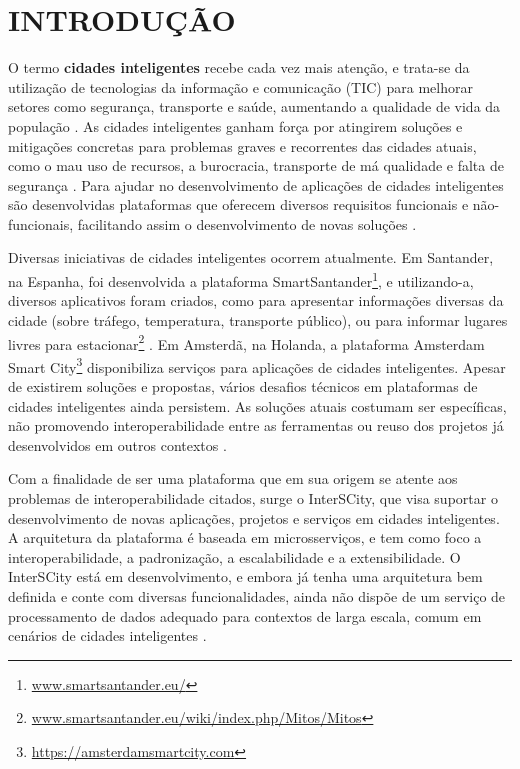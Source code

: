 \chapter[INTRODUÇÃO]{INTRODUÇÃO}
\label{chapter:intro}

O termo \textbf{cidades inteligentes} recebe cada vez mais atenção, e trata-se
da utilização de tecnologias da informação e comunicação (TIC) para melhorar
setores como segurança, transporte e saúde, aumentando a qualidade de vida
da população \cite{batty2012smart}. As cidades inteligentes ganham força por
atingirem soluções e mitigações concretas para problemas graves e recorrentes
das cidades atuais, como o mau uso de recursos, a burocracia, transporte de má
qualidade e falta de segurança \cite{batty2012smart}. Para ajudar no
desenvolvimento de aplicações de cidades inteligentes são desenvolvidas
plataformas que oferecem diversos requisitos funcionais e não-funcionais,
facilitando assim o desenvolvimento de novas soluções \cite{kon2016}.

Diversas iniciativas de cidades inteligentes ocorrem atualmente. Em Santander,
na Espanha, foi desenvolvida a plataforma
SmartSantander\footnote{\url{www.smartsantander.eu/}}, e utilizando-a,
diversos aplicativos foram criados, como para apresentar informações diversas
da cidade (sobre tráfego, temperatura, transporte público), ou para informar
lugares livres para
estacionar\footnote{\url{www.smartsantander.eu/wiki/index.php/Mitos/Mitos}}
\cite{gutierrez2013}.  Em Amsterdã, na Holanda, a plataforma Amsterdam Smart
City\footnote{\url{https://amsterdamsmartcity.com}} disponibiliza serviços para
aplicações de cidades inteligentes. Apesar de existirem soluções
e propostas, vários desafios técnicos em plataformas de cidades inteligentes
ainda persistem. As soluções atuais costumam ser específicas, não promovendo
interoperabilidade entre as ferramentas ou reuso dos projetos já
desenvolvidos em outros contextos \cite{delesposte2017}.

Com a finalidade de ser uma plataforma que em sua origem se atente aos
problemas de interoperabilidade citados, surge o InterSCity, que visa
suportar o desenvolvimento de novas aplicações, projetos e serviços em cidades
inteligentes. A arquitetura da plataforma é baseada em microsserviços, e
tem como foco a interoperabilidade, a padronização, a escalabilidade e
a extensibilidade. O InterSCity está em desenvolvimento, e embora já tenha uma
arquitetura bem definida e conte com diversas funcionalidades, ainda não dispõe
de um serviço de processamento de dados adequado para contextos de larga
escala, comum em cenários de cidades inteligentes \cite{alnuaimi2015}.

